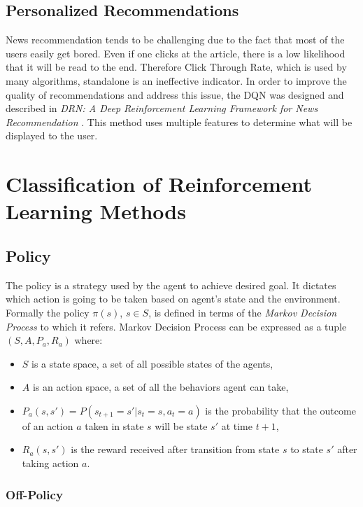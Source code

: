 \subsection{Personalized Recommendations}
\label{sub:intro-personalized-reccomendations}
News recommendation tends to be challenging due to the fact that most of the users easily get bored. Even if one clicks at the article, there is a low likelihood that it will be read to the end. Therefore Click Through Rate, which is used by many algorithms, standalone is an ineffective indicator. In order to improve the quality of recommendations and address this issue, the DQN was designed and described in \emph{DRN: A Deep Reinforcement Learning Framework for News Recommendation} \cite{DRNNewsRecommendaiton}. This method uses multiple features to determine what will be displayed to the user.

\section{Classification of Reinforcement Learning Methods}
\label{sec:classification-of-reinforcement-learning-methods}

\subsection{Policy}
\label{sub:policy}

The policy is a strategy used by the agent to achieve desired goal. It dictates which action is going to be taken based on agent's state and the environment. Formally the policy $\pi(s)$, $s\in{S}$, is defined in terms of the \emph{Markov Decision Process} to which it refers. Markov Decision Process can be expressed as a tuple $(S, A, P_a, R_a)$ where:

\begin{itemize}
    \item $S$ is a state space, a set of all possible states of the agents,
    \item $A$ is an action space, a set of all the behaviors agent can take,
    \item $P_a(s, s') = P(s_{t+1} = s' | s_t = s, a_t = a)$ is the probability that the outcome of an action $a$ taken in state $s$ will be state $s'$ at time $t+1$,
    \item $R_a(s, s')$ is the reward received after transition from state $s$ to state $s'$ after taking action $a$.
\end{itemize}

\subsubsection*{Off-Policy}
\label{sub2:off-poicy}

